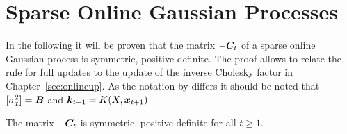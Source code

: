 \chapter{Sparse Online Gaussian Processes}\label{sec:sparse-gp-apdx}
In the following it will be proven that the matrix $-\bm{C}_t$ of a sparse 
online Gaussian process \parencite{Csato:2002fp} is symmetric, positive 
definite. The proof allows to relate the rule for full updates to the update of 
the inverse Cholesky factor in Chapter~\ref{sec:onlineup}. As the notation by 
\textcite{Csato:2002fp} differs it should be noted that $[\sigma_x^2] = \bm{B}$ 
and $\bm{k}_{t+1} = K(X, {\bm{x}_{t+1}})$.

\begin{theorem}
    The matrix $-\bm{C}_t$ is symmetric, positive definite for all $t \geq 1$.
\end{theorem}

